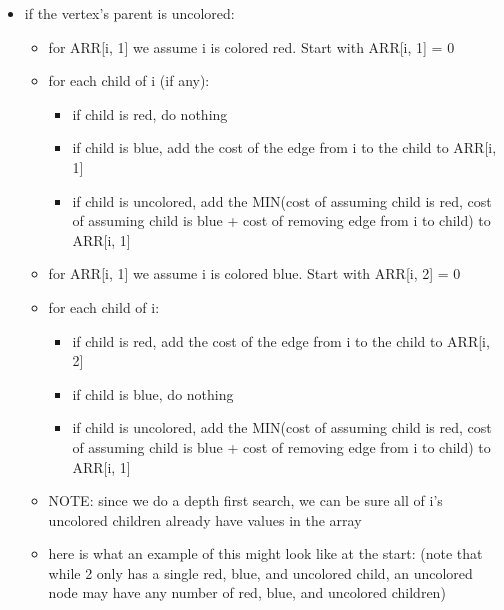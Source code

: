\documentclass[a4paper]{article}
\begin{document}
\begin{itemize}
    \item if the vertex's parent is uncolored:
    \begin{itemize}
        \item for ARR[i, 1] we assume i is colored red. Start with ARR[i, 1] = 0
        \item for each child of i (if any):
        \begin{itemize}
            \item if child is red, do nothing
            \item if child is blue, add the cost of the edge from i to the child to ARR[i, 1]
            \item if child is uncolored, add the MIN(cost of assuming child is red, cost of assuming child is blue + cost of removing edge from i to child) to ARR[i, 1]
        \end{itemize}
        \item for ARR[i, 1] we assume i is colored blue. Start with ARR[i, 2] = 0
        \item for each child of i:
        \begin{itemize}
            \item if child is red, add the cost of the edge from i to the child to ARR[i, 2]
            \item if child is blue, do nothing
            \item if child is uncolored, add the MIN(cost of assuming child is red, cost of assuming child is blue + cost of removing edge from i to child) to ARR[i, 1]
        \end{itemize}
        \item NOTE: since we do a depth first search, we can be sure all of i's uncolored children already have values in the array
        \item here is what an example of this might look like at the start: (note that while 2 only has a single red, blue, and uncolored child, an uncolored node may have any number of red, blue, and uncolored children)
    \end{itemize}
\end{itemize}
    
\end{document}
